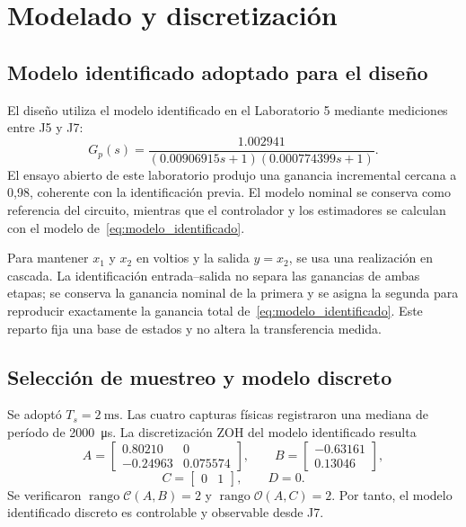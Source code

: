 \section{Modelado y discretización}
\subsection{Modelo identificado adoptado para el diseño}
El diseño utiliza el modelo identificado en el Laboratorio 5 mediante
mediciones entre J5 y J7:
\begin{equation}
G_p(s)=\frac{1.002941}{(0.00906915s+1)(0.000774399s+1)}.
\label{eq:modelo_identificado}
\end{equation}
El ensayo abierto de este laboratorio produjo una ganancia incremental cercana
a 0,98, coherente con la identificación previa. El modelo nominal se conserva
como referencia del circuito, mientras que el controlador y los estimadores se
calculan con el modelo de~\eqref{eq:modelo_identificado}.

Para mantener $x_1$ y $x_2$ en voltios y la salida $y=x_2$, se usa una
realización en cascada. La identificación entrada--salida no separa las
ganancias de ambas etapas; se conserva la ganancia nominal de la primera y se
asigna la segunda para reproducir exactamente la ganancia total
de~\eqref{eq:modelo_identificado}. Este reparto fija una base de estados y no
altera la transferencia medida.

\subsection{Selección de muestreo y modelo discreto}
Se adoptó $T_s=\SI{2}{\milli\second}$. Las cuatro capturas físicas registraron
una mediana de período de \SI{2000}{\micro\second}. La discretización ZOH del
modelo identificado resulta
\begin{equation}
A=\begin{bmatrix}0.80210&0\\-0.24963&0.075574\end{bmatrix},\qquad
B=\begin{bmatrix}-0.63161\\0.13046\end{bmatrix},
\end{equation}
\begin{equation}
C=\begin{bmatrix}0&1\end{bmatrix},\qquad D=0.
\end{equation}
Se verificaron
$\operatorname{rango}\mathcal C(A,B)=2$ y
$\operatorname{rango}\mathcal O(A,C)=2$. Por tanto, el modelo identificado
discreto es controlable y observable desde J7.

